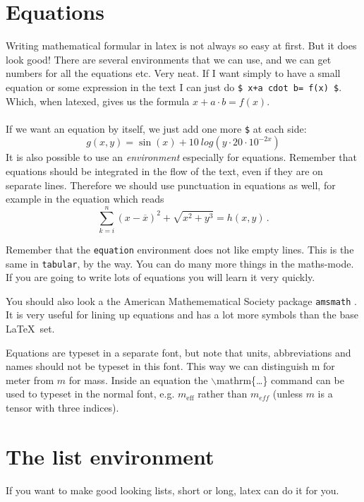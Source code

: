 \documentclass[a4paper,12pt]{article}
\begin{document}
\section{Equations}
\setcounter{equation}{0}

Writing mathematical formular in latex is not always so easy at first. But it
does look good! There are several environments that we can use, and we can get
numbers for all the equations etc. Very neat. If I want simply to have a small
equation or some expression in the text I can just do {\tt \$ x+a  cdot b= f(x)
\$}. Which, when latexed, gives us the formula $x+a \cdot b= f(x)$.
\\ \\
If we want an equation by itself, we just add one more {\tt \$} at each side:
$$ g(x,y)=\sin (x) + 10 \ log(y \cdot 20 \cdot 10^{-2x}) $$
It is also possible to use an {\sl environment} especially for equations.
Remember that equations should be integrated in the flow of the text, even if
they are on separate lines. Therefore we should use punctuation in equations as
well, for example in the equation which reads
\begin{equation}
  \sum_{k=i}^n (x- \overline{x})^2 +\sqrt{x^2 + y^3} = h(x,y) \label{eq:smart}
  \, .
\end{equation}

Remember that the {\tt equation} environment does not like empty lines.  This
is the same in {\tt tabular}, by the way.  You can do many more things in the
maths-mode. If you are going to write lots of equations you will learn it very
quickly.

You should also look a the American Mathemematical Society package
{\tt amsmath} \cite{amsmath}. It is very useful for lining up equations and
has a lot more symbols than the base \LaTeX\ set.

Equations are typeset in a separate font, but note that units,
abbreviations and names should not be typeset in this font. This way
we can distinguish m for meter from $m$ for mass. Inside an equation
the $\backslash$mathrm\{\ldots\} command can be used to typeset in the normal font,
e.g. $m_{\mathrm{eff}}$ rather than $m_{eff}$ (unless $m$ is a tensor
with three indices). 

\section{The list environment}
\setcounter{equation}{0}

If you want to make good looking lists, short or long, latex can do it for you.
\end{document}

